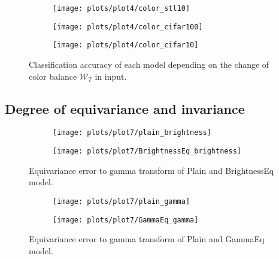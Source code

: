     \begin{figure}[h]
    \begin{adjustwidth}{-11em}{-11em}
        \centering
        \begin{subfigure}{0.6\textwidth}
            \texttt{[image: plots/plot4/color\_stl10]}
        \end{subfigure}
        \begin{subfigure}{0.6\textwidth}
            \texttt{[image: plots/plot4/color\_cifar100]}
        \end{subfigure}
        \begin{subfigure}{0.6\textwidth}
            \texttt{[image: plots/plot4/color\_cifar10]}
        \end{subfigure}
    \end{adjustwidth}
        \caption{Classification accuracy of each model depending on the change
        of color balance $\mathcal{W}_T$ in input.}
        \label{fig:plot4contrast}
    \end{figure}


\newpage
\subsection{Degree of equivariance and invariance}
    \begin{figure}[h]
    \begin{adjustwidth}{-11em}{-11em}
        \centering
        \begin{subfigure}{0.4\textwidth}
            \texttt{[image: plots/plot7/plain\_brightness]}
        \end{subfigure}
        \begin{subfigure}{0.4\textwidth}
            \texttt{[image: plots/plot7/BrightnessEq\_brightness]}
        \end{subfigure}
    \end{adjustwidth}
        \caption{Equivariance error to gamma transform of Plain and BrightnessEq
        model.}
        \label{fig:plot7brightness}
    \end{figure}

    \begin{figure}[h]
    \begin{adjustwidth}{-11em}{-11em}
        \centering
        \begin{subfigure}{0.4\textwidth}
            \texttt{[image: plots/plot7/plain\_gamma]}
        \end{subfigure}
        \begin{subfigure}{0.4\textwidth}
            \texttt{[image: plots/plot7/GammaEq\_gamma]}
        \end{subfigure}
    \end{adjustwidth}
        \caption{Equivariance error to gamma transform of Plain and GammaEq
        model.}
        \label{fig:plot7gamma}
    \end{figure}

